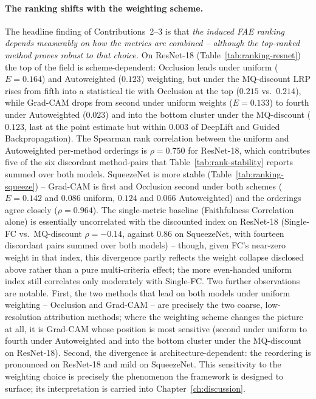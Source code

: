 \paragraph{The ranking shifts with the weighting scheme.}
The headline finding of Contributions~2--3 is that \emph{the induced FAE
ranking depends measurably on how the metrics are combined -- although the
top-ranked method proves robust to that choice.} On ResNet-18
(Table~\ref{tab:ranking-resnet}) the top of the field is scheme-dependent:
Occlusion leads under uniform ($E = 0.164$) and Autoweighted ($0.123$)
weighting, but under the MQ-discount LRP rises from fifth into a
statistical tie with Occlusion at the top ($0.215$ vs.\ $0.214$), while
Grad-CAM
drops from second under uniform
weights ($E = 0.133$) to fourth under Autoweighted ($0.023$) and into the
bottom cluster under
the MQ-discount ($0.123$, last at the point estimate but within $0.003$ of
DeepLift and Guided Backpropagation). The Spearman rank correlation between the
uniform and Autoweighted per-method orderings is $\rho = 0.750$ for ResNet-18,
which contributes five of the six discordant method-pairs that
Table~\ref{tab:rank-stability} reports summed over both models. SqueezeNet is
more stable (Table~\ref{tab:ranking-squeeze}) -- Grad-CAM is first and
Occlusion second under both schemes ($E = 0.142$ and $0.086$ uniform, $0.124$
and $0.066$ Autoweighted) and the orderings agree closely ($\rho = 0.964$).
The single-metric baseline (Faithfulness Correlation alone) is
essentially uncorrelated with the discounted index on ResNet-18
(Single-FC vs.\ MQ-discount $\rho = -0.14$, against $0.86$ on SqueezeNet,
with fourteen discordant pairs summed over
both models) -- though, given FC's near-zero weight in that index, this
divergence partly reflects the weight collapse disclosed above rather than
a pure multi-criteria effect; the more even-handed uniform index still
correlates only moderately with Single-FC.
Two further observations are notable. First, the two
methods that lead on both models under uniform weighting -- Occlusion and
Grad-CAM -- are precisely the two coarse, low-resolution attribution methods;
where the weighting scheme changes the picture at all, it is Grad-CAM whose
position is most sensitive (second under uniform to fourth under Autoweighted
and into the bottom cluster under the MQ-discount on ResNet-18). Second, the
divergence is architecture-dependent: the reordering is pronounced on
ResNet-18 and mild on SqueezeNet. This sensitivity to the weighting choice is
precisely the
phenomenon the framework is designed to surface; its interpretation is carried
into Chapter~\ref{ch:discussion}.

